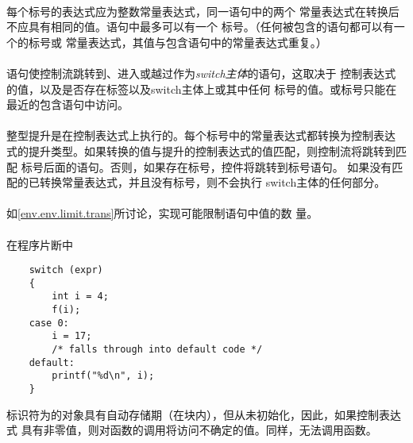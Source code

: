 {\paragraph{}
每个标号的表达式应为整数常量表达式，同一语句中的两个
常量表达式在转换后不应具有相同的值。语句中最多可以有一个
标号。（任何被包含的语句都可以有一个的标号或
常量表达式，其值与包含语句中的常量表达式重复。）

\semantic
\paragraph{}
语句使控制流跳转到、进入或越过作为\textit{switch主体}的语句，这取决于
控制表达式的值，以及是否存在标签以及switch主体上或其中任何
标号的值。或标号只能在最近的包含语句中访问。

\paragraph{}
整型提升是在控制表达式上执行的。每个标号中的常量表达式都转换为控制表达
式的提升类型。如果转换的值与提升的控制表达式的值匹配，则控制流将跳转到匹配
标号后面的语句。否则，如果存在标号，控件将跳转到标号语句。
如果没有匹配的已转换常量表达式，并且没有标号，则不会执行
switch主体的任何部分。

\implimit
\paragraph{}
如\ref{env.env.limit.trans}所讨论，实现可能限制语句中值的数
量。

\paragraph{}
\ex* 在程序片断中
\begin{lstlisting}
    switch (expr)
    {
        int i = 4;
        f(i);
    case 0:
        i = 17;
        /* falls through into default code */
    default:
        printf("%d\n", i);
    }
\end{lstlisting}
标识符为的对象具有自动存储期（在块内），但从未初始化，因此，如果控制表达式
具有非零值，则对函数的调用将访问不确定的值。同样，无法调用函数。

\syntax
\paragraph{}

}
